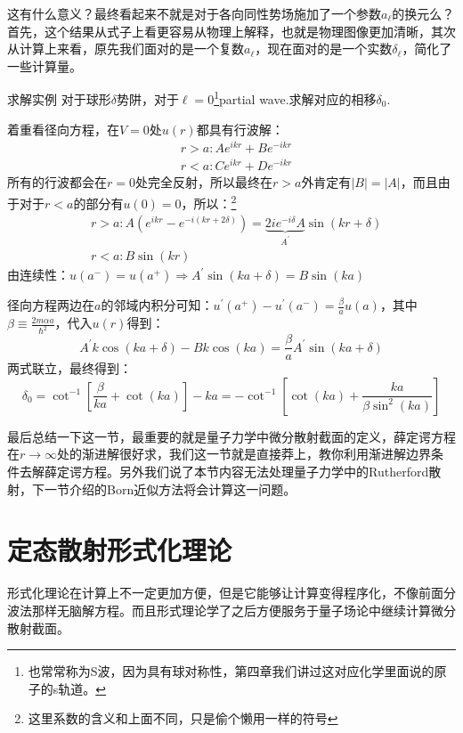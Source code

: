 \documentclass[a4paper,zihao=-4,linespread=1]{ctexrep}
\begin{document}
	这有什么意义？最终看起来不就是对于各向同性势场施加了一个参数$a_\ell$的换元么？首先，这个结果从式子上看更容易从物理上解释，也就是物理图像更加清晰，其次从计算上来看，原先我们面对的是一个复数$a_\ell$，现在面对的是一个实数$\delta_\ell$，简化了一些计算量。
	
	\begin{example}{求解实例}
		对于球形$\delta$势阱，对于$\ell=0$\footnote{也常常称为S波，因为具有球对称性，第四章我们讲过这对应化学里面说的原子的s轨道。}partial wave.求解对应的相移$\delta_0$.
		
		着重看径向方程，在$V=0$处$u(r)$都具有行波解：
		\begin{equation*}
			\begin{aligned}
				&r>a: Ae^{ikr}+Be^{-ikr}\\
				&r<a: Ce^{ikr}+De^{-ikr}
			\end{aligned}
		\end{equation*}
		所有的行波都会在$r=0$处完全反射，所以最终在$r>a$外肯定有$|B|=|A|$，而且由于对于$r<a$的部分有$u(0)=0$，所以：\footnote{这里系数的含义和上面不同，只是偷个懒用一样的符号}
		\begin{equation*}
			\begin{aligned}
				&r>a: A\left(e^{ikr}-e^{-i(kr+2\delta)}\right)=\underbrace{2ie^{-i\delta}A}_{A^\prime}\sin(kr+\delta)\\
				&r<a: B\sin (kr)
			\end{aligned}
		\end{equation*}
		由连续性：$u(a^-)=u(a^+)\Rightarrow A^\prime\sin(ka+\delta)=B\sin(ka)$
		
		\setlength\parindent{2em}径向方程两边在$a$的邻域内积分可知：$u^\prime(a^+)-u^\prime(a^-)=\frac{\beta}{a}u(a)$，其中$\beta\equiv \frac{2m\alpha a}{\hbar^2}$，代入$u(r)$得到：
		\[A^\prime k\cos(ka+\delta)-Bk\cos(ka)=\frac{\beta}{a}A^\prime\sin(ka+\delta)\]
		两式联立，最终得到：
		\[\delta _0=\cot^{-1}\left[\frac{\beta}{ka}+\cot(ka)\right]-ka= -\cot^{-1}\left[\cot(ka)+\frac{ka}{\beta\sin^2(ka)}\right]\]
	\end{example}
	
	最后总结一下这一节，最重要的就是量子力学中微分散射截面的定义，薛定谔方程在$r\to\infty$处的渐进解很好求，我们这一节就是直接莽上，教你利用渐进解边界条件去解薛定谔方程。另外我们说了本节内容无法处理量子力学中的Rutherford散射，下一节介绍的Born近似方法将会计算这一问题。
	
	\section{定态散射形式化理论}
	形式化理论在计算上不一定更加方便，但是它能够让计算变得程序化，不像前面分波法那样无脑解方程。而且形式理论学了之后方便服务于量子场论中继续计算微分散射截面。
\end{document}
